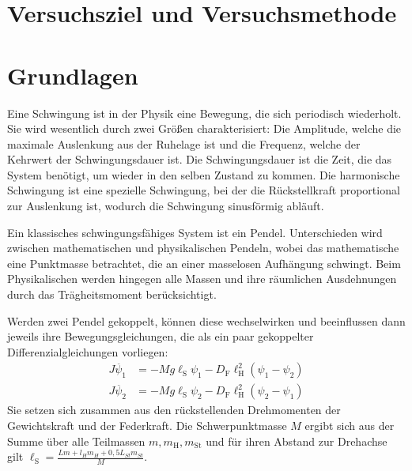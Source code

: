 \documentclass[
12pt,
a4paper,
bibliography=totocnumbered, %
twoside, %
BCOR=1cm, %
]{scrartcl}
\newcommand{\lh}{\ell_{\mathrm{H}}}
\newcommand{\ls}{\ell_{\mathrm{S}}}
\begin{document}
\thispagestyle{empty}



\thispagestyle{empty}

\tableofcontents

\clearpage %

\renewcommand{\thepage}{\arabic{page}}
\setcounter{page}{1}


\section[Versuchsziel]{Versuchsziel und Versuchsmethode}



\section{Grundlagen}

Eine Schwingung ist in der Physik eine Bewegung, die sich periodisch wiederholt. Sie wird wesentlich durch zwei Größen charakterisiert: Die Amplitude, welche die maximale Auslenkung aus der Ruhelage ist und die Frequenz, welche der Kehrwert der Schwingungsdauer ist. Die Schwingungsdauer ist die Zeit, die das System benötigt, um wieder in den selben Zustand zu kommen. Die harmonische Schwingung ist eine spezielle Schwingung, bei der die Rückstellkraft proportional zur Auslenkung ist, wodurch die Schwingung sinusförmig abläuft.

Ein klassisches schwingungsfähiges  System ist ein Pendel. Unterschieden wird zwischen mathematischen und physikalischen Pendeln, wobei das mathematische eine Punktmasse betrachtet, die an einer masselosen Aufhängung schwingt. Beim Physikalischen werden hingegen alle Massen und ihre räumlichen Ausdehnungen durch das Trägheitsmoment berücksichtigt.

Werden zwei Pendel gekoppelt, können diese wechselwirken und beeinflussen dann jeweils ihre Bewegungsgleichungen, die als ein paar gekoppelter Differenzialgleichungen vorliegen:
\begin{align}
	J\ddot{\psi_1} &= -Mg\ls\psi_1 - D_{\text{F}}\lh^2(\psi_1-\psi_2)\\
	J\ddot{\psi_2} &= -Mg\ls\psi_2 - D_{\text{F}}\lh^2(\psi_2-\psi_1)
\end{align}
Sie setzen sich zusammen aus den rückstellenden Drehmomenten der Gewichtskraft und der Federkraft. Die Schwerpunktmasse \(M\) ergibt sich aus der Summe über alle Teilmassen \(m, m_{\text{H}}, m_{\text{St}}\) und für ihren Abstand zur Drehachse gilt \(\ell_{\text{S}} = \frac{Lm+l_Hm_H+0,5L_{St}m_{St}}{M}\).
\end{document}
